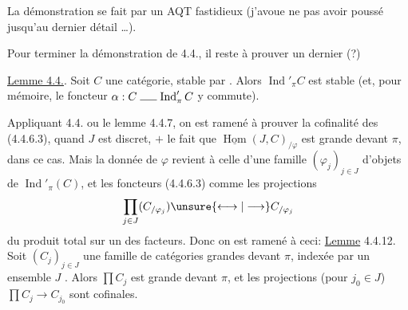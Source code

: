 La démonstration se fait par un AQT fastidieux (j'avoue ne pas avoir poussé jusqu'au dernier détail \ldots).

Pour terminer la démonstration de 4.4., il reste à prouver un dernier (?)

\uline{Lemme 4.4.}. Soit $C$ une  catégorie, stable par  . Alors $\operatorname{Ind}'_{\pi}C$ est stable   (et, pour mémoire, le foncteur $\alpha:C\mathrel{\rule{1.5em}{0.4pt}}\operatorname{Ind}'_{\pi}C$ y commute).

Appliquant   4.4. ou le lemme 4.4.7, on est ramené à prouver la cofinalité des (4.4.6.3), quand $J$ est discret, $+$ le fait que $\underline{\operatorname{Hom}}(J,C)_{/\varphi}$ est grande devant $\pi$, dans ce cas. Mais la donnée de $\varphi$ revient à celle d'une famille $(\varphi_j)_{j\in J}$ d'objets de $\operatorname{Ind}'_{\pi}(C)$, et les foncteurs (4.4.6.3)  comme les projections
\[
\prod_{j\in J}(C_{/\varphi_j})\unsure{\longleftrightarrow|\longrightarrow} C_{/\varphi_j}
\]
du produit total sur un des facteurs. Donc on est ramené à ceci:
\uline{Lemme} 4.4.12. Soit  $(C_j)_{j\in J}$ une famille de  catégories grandes devant $\pi$, indexée par un  ensemble $J$ . Alors $\prod C_j$ est grande devant $\pi$, et les projections (pour $j_0\in J$) $\prod C_j\longrightarrow C_{j_0}$ sont cofinales.

